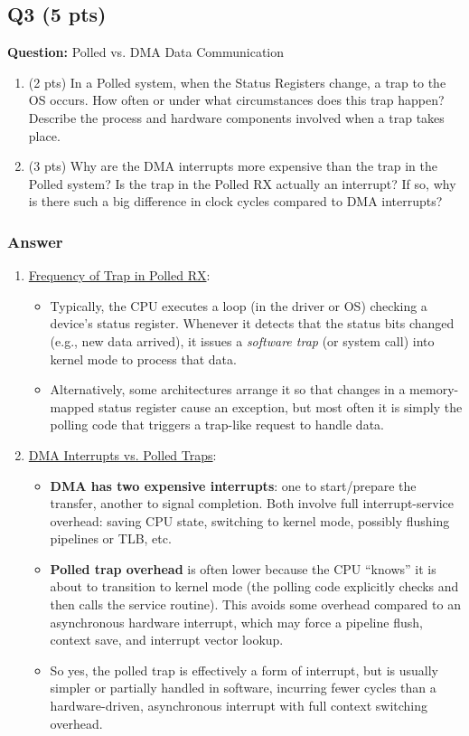 \documentclass[12pt]{article}
\begin{document}
	\subsection*{Q3 (5 pts)}
	\textbf{Question:} Polled vs. DMA Data Communication
	\begin{enumerate}
		\item (2 pts) In a Polled system, when the Status Registers change, a trap to the OS occurs. How often or under what circumstances does this trap happen? Describe the process and hardware components involved when a trap takes place.
		\item (3 pts) Why are the DMA interrupts more expensive than the trap in the Polled system? Is the trap in the Polled RX actually an interrupt? If so, why is there such a big difference in clock cycles compared to DMA interrupts?
	\end{enumerate}
	
	\subsubsection*{Answer}
	\begin{enumerate}
		\item \underline{Frequency of Trap in Polled RX}:
		\begin{itemize}
			\item Typically, the CPU executes a loop (in the driver or OS) checking a device’s status register. Whenever it detects that the status bits changed (e.g., new data arrived), it issues a \emph{software trap} (or system call) into kernel mode to process that data. 
			\item Alternatively, some architectures arrange it so that changes in a memory-mapped status register cause an exception, but most often it is simply the polling code that triggers a trap-like request to handle data.
		\end{itemize}
		
		\item \underline{DMA Interrupts vs. Polled Traps}:
		\begin{itemize}
			\item \textbf{DMA has two expensive interrupts}: one to start/prepare the transfer, another to signal completion. Both involve full interrupt-service overhead: saving CPU state, switching to kernel mode, possibly flushing pipelines or TLB, etc.
			\item \textbf{Polled trap overhead} is often lower because the CPU “knows” it is about to transition to kernel mode (the polling code explicitly checks and then calls the service routine). This avoids some overhead compared to an asynchronous hardware interrupt, which may force a pipeline flush, context save, and interrupt vector lookup.
			\item So yes, the polled trap is effectively a form of interrupt, but is usually simpler or partially handled in software, incurring fewer cycles than a hardware-driven, asynchronous interrupt with full context switching overhead.
		\end{itemize}
	\end{enumerate}
	
\end{document}
